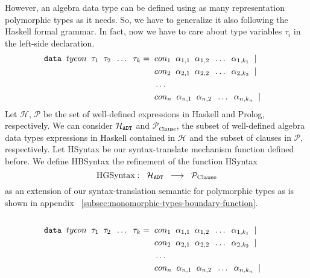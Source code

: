 	However, an algebra data type can be defined using as many representation polymorphic types as it needs. So, we have to generalize it also following the Haskell formal grammar. In fact, now we have to care about type variables $\tau_i$ in the left-side declaration.\\
	\begin{align*}
		\texttt{data} \;\; tycon \;\; \tau_1 \;\; \tau_2 \;\; \ldots \;\; \tau_k 	= & \;\; con_1 \;\; \alpha_{1,1} \;\; \alpha_{1,2} \;\; \ldots \;\; \alpha_{1,k_1} \;\; | &   &   \\
		                                                                         & \;\; con_2 \;\; \alpha_{2,1} \;\; \alpha_{2,2} \;\; \ldots \;\; \alpha_{2,k_2} \;\; | &   &   \\
		                                                                         & \;\; \ldots \;\;                                                                      &   &   \\
		                                                                         & \;\; con_n \;\; \alpha_{n,1} \;\; \alpha_{n,2} \;\; \ldots \;\; \alpha_{n,k_n} \;\; | &   &   \\
	\end{align*}
 Let $\mathcal{H}$, $\mathcal{P}$ be the set of well-defined expressions in Haskell and Prolog, respectively. We can consider $\mathcal{H}_{\texttt{ADT}}$ and $\mathcal{P}_{\text{Clause}}$, the subset of well-defined algebra data types expressions in Haskell contained in $\mathcal{H}$ and the subset of clauses in $\mathcal{P}$, respectively. Let HSyntax be our syntax-translate mechanism function defined before. We define HBSyntax the refinement of the function HSyntax $$\text{HGSyntax} :\;\; \mathcal{H}_{\texttt{ADT}} \;\; \longrightarrow \;\; \mathcal{P}_{\text{Clause}}$$ as an extension of our syntax-translation semantic for polymorphic types as is shown in appendix ~\ref{subsec:monomorphic-types-boundary-function}.\\\\
	\begin{align*}
		\texttt{data} \;\; tycon \;\; \tau_1 \;\; \tau_2 \;\; \ldots \;\; \tau_k 	= & \;\; con_1 \;\; \alpha_{1,1} \;\; \alpha_{1,2} \;\; \ldots \;\; \alpha_{1,k_1} \;\; | &   &   \\
		                                                                         & \;\; con_2 \;\; \alpha_{2,1} \;\; \alpha_{2,2} \;\; \ldots \;\; \alpha_{2,k_2} \;\; | &   &   \\
		                                                                         & \;\; \ldots \;\;                                                                      &   &   \\
		                                                                         & \;\; con_n \;\; \alpha_{n,1} \;\; \alpha_{n,2} \;\; \ldots \;\; \alpha_{n,k_n} \;\; | &   &   \\
	\end{align*}
